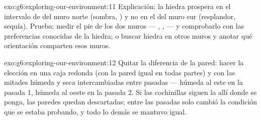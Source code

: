 \begin{solution}{exo:g6:exploring-our-environment:11}
Explicación: la hiedra prospera en el intervalo de  del
muro norte (sombra, ) y no en el del muro sur (resplandor,
sequía). Prueba: medir el pie de los dos muros --- ,
,  --- y comprobarlo con las preferencias conocidas de la
hiedra; o buscar hiedra en otros muros y anotar qué orientación
comparten esos muros.
\end{solution}

\begin{solution}{exo:g6:exploring-our-environment:12}
Quitar la diferencia de la pared: hacer la elección en una caja
redonda (con la pared igual en todas partes) y con las mitades húmeda
y seca intercambiadas entre pasadas --- húmeda al este en la pasada 1,
húmeda al oeste en la pasada 2. Si las cochinillas siguen la 
allí donde se ponga, las paredes quedan descartadas; entre las pasadas
solo cambió la condición que se estaba probando, y todo lo demás se
mantuvo igual.
\end{solution}


